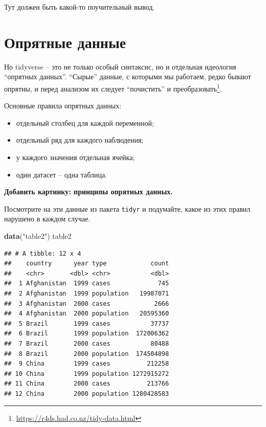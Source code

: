 \documentclass[
]{book}
\newenvironment{Shaded}{\begin{snugshade}}{\end{snugshade}}
\newcommand{\FunctionTok}[1]{\textcolor[rgb]{0.13,0.29,0.53}{\textbf{#1}}}
\newcommand{\NormalTok}[1]{#1}
\newcommand{\StringTok}[1]{\textcolor[rgb]{0.31,0.60,0.02}{#1}}
\providecommand{\tightlist}{%
  \setlength{\itemsep}{0pt}\setlength{\parskip}{0pt}}
\theoremstyle{definition}
\theoremstyle{definition}
\theoremstyle{definition}
\theoremstyle{definition}
\theoremstyle{remark}
\begin{document}
Тут должен быть какой-то поучительный вывод.

\hypertarget{ux43eux43fux440ux44fux442ux43dux44bux435-ux434ux430ux43dux43dux44bux435-1}{%
\section{Опрятные данные}\label{ux43eux43fux440ux44fux442ux43dux44bux435-ux434ux430ux43dux43dux44bux435-1}}

Но tidyverse -- это не только особый синтаксис, но и отдельная идеология ``опрятных данных''. ``Сырые'' данные, с которыми мы работаем, редко бывают опрятны, и перед анализом их следует ``почистить'' и преобразовать\footnote{\url{https://r4ds.had.co.nz/tidy-data.html}}.

Основные правила опрятных данных:

\begin{itemize}
\tightlist
\item
  отдельный столбец для каждой переменной;
\item
  отдельный ряд для каждого наблюдения;
\item
  у каждого значения отдельная ячейка;
\item
  один датасет -- одна таблица.
\end{itemize}

\textbf{Добавить картинку: принципы опрятных данных.}

Посмотрите на эти данные из пакета \texttt{tidyr} и подумайте, какое из этих правил нарушено в каждом случае.

\begin{Shaded}
\begin{Highlighting}[]
\FunctionTok{data}\NormalTok{(}\StringTok{"table2"}\NormalTok{)}
\NormalTok{table2}
\end{Highlighting}
\end{Shaded}

\begin{verbatim}
## # A tibble: 12 x 4
##    country      year type            count
##    <chr>       <dbl> <chr>           <dbl>
##  1 Afghanistan  1999 cases             745
##  2 Afghanistan  1999 population   19987071
##  3 Afghanistan  2000 cases            2666
##  4 Afghanistan  2000 population   20595360
##  5 Brazil       1999 cases           37737
##  6 Brazil       1999 population  172006362
##  7 Brazil       2000 cases           80488
##  8 Brazil       2000 population  174504898
##  9 China        1999 cases          212258
## 10 China        1999 population 1272915272
## 11 China        2000 cases          213766
## 12 China        2000 population 1280428583
\end{verbatim}
\end{document}
